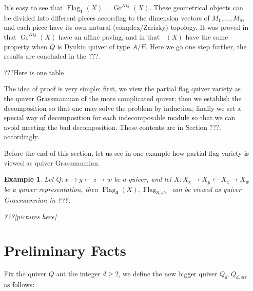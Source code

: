 \documentclass[reqno,11pt]{amsart}
\numberwithin{equation}{section}
\theoremstyle{plain}
\newtheorem{eg}[theorem]{Example}
\theoremstyle{plain}
\numberwithin{equation}{section}
\theoremstyle{remark}
\DeclareMathOperator{\Flagd}{\operatorname{Flag}_{\mathbf{d}}}
\newcommand{\Grq}{\operatorname{Gr}^{KQ}}
\newcommand{\Flag}[1]{\operatorname{Flag}_{\mathbf{#1}}}
\newcommand{\Flagstr}[1]{\operatorname{Flag}_{\mathbf{#1},str}}
\begin{document}
It's easy to see that $\Flag{1}(X)=\Grq(X)$. These geometrical objects can be divided into different pieces according to the dimension vectors of $M_1,\ldots,M_d$, and each piece have its own natural (complex/Zarisky) topology. It was proved in \cite{irelli2019cell} that $\Grq(X)$ have an affine paving, and in \cite{maksimau2019flag} that $\Flagd(X)$ have the same property when $Q$ is Dynkin quiver of type $A/E$. Here we go one step further, the results are concluded in the ???.

???Here is one table

The idea of proof is very simple: first, we view the partial flag quiver variety as the quiver Grassmannian of the more complicated quiver; then we establish the decomposition so that one may solve the problem by induction; finally we set a special way of decomposition for each indecomposable module so that we can avoid meeting the bad decomposition. These contents are in Section ???, accordingly.

Before the end of this section, let us see in one example how partial flag variety is viewed as quiver Grassmannian.

\begin{eg}
Let $Q\colon x \longrightarrow y \longleftarrow z \longrightarrow w$ be a quiver, and let $X\colon X_x \longrightarrow X_y \longleftarrow X_z \longrightarrow X_w$ be a quiver representation, then $\Flag{3}(X),\Flagstr{3}$ can be viewed as quiver Grassmannian in ???:

???[pictures here]


\end{eg}

\section{Preliminary Facts}
Fix the quiver $Q$ ant the integer $d \geqslant 2$, we define the new bigger quiver $Q_{d},Q_{d,str}$ as follows:
\end{document}
